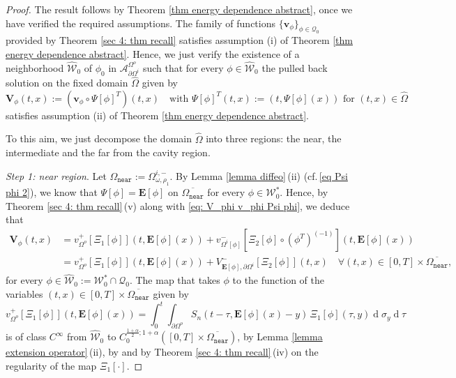 \documentclass[11pt,reqno,a4paper]{amsart}
\theoremstyle{plain}
\theoremstyle{definition}
\renewcommand{\d}[1]{\ensuremath{\operatorname{d}\!{#1}}}
\begin{document}
\begin{proof}
    The result follows by Theorem \ref{thm energy dependence abstract}, once we have verified the required assumptions. The family of functions $\{\mathbf{v}_\phi\}_{\phi \in \mathcal{Q}_0}$ provided by Theorem \ref{sec 4: thm recall} satisfies assumption (i) of Theorem \ref{thm energy dependence abstract}. Hence, we just verify the existence of a neighborhood $\widehat{\mathcal W}_0$ of $\phi_0$ in $\mathcal A_{\partial\Omega^i}^{\Omega^o}$ such that for every $\phi\in \widehat{\mathcal{W}}_0$ the pulled back solution on the fixed domain $\widehat\Omega$ given by
    \begin{equation}\label{eq: V_phi v_phi Psi phi}
    \mathbf{V}_\phi(t,x):= \left( \mathbf{v}_\phi \circ \Psi[\phi]^T \right) (t,x) 
    \quad \text{with }
    \Psi[\phi]^T(t,x):=(t,\Psi[\phi](x)) \text{ for } (t,x) \in \widehat\Omega
    \end{equation}  
    satisfies assumption (ii) of Theorem \ref{thm energy dependence abstract}.

    To this aim, we just decompose the domain $\widehat\Omega$ into three regions: the near, the intermediate and the far from the cavity region. 
    
    \smallskip
    \textit{Step 1: near region}. Let $\Omega_{\mathtt{near}}:= \Omega^{i,-}_{\omega,\rho_1}$. By Lemma \ref{lemma diffeo}\,(ii) (cf.\,\eqref{eq Psi phi 2}), we know that $\Psi[\phi] = \mathbf{E}[\phi]$ on $\overline{\Omega_{\mathtt{near}}}$ for every $\phi \in \mathcal{W}^\ast_0$. Hence, by Theorem \ref{sec 4: thm recall}\,(v) along with \eqref{eq: V_phi v_phi Psi phi}, we deduce that
    \begin{equation*}
    \begin{split}
    \mathbf{V}_\phi(t,x) &=  v^+_{\Omega^o} [\Xi_1[\phi]](t, \mathbf{E}[\phi](x)) + v^-_{\Omega^i[\phi]}
    \left[\Xi_2[\phi]\circ (\phi^T)^{(-1)}\right](t, \mathbf{E}[\phi](x))
    \\
    & = v^+_{\Omega^o} [\Xi_1[\phi]](t, \mathbf{E}[\phi](x)) + V^-_{\mathbf{E}[\phi], \partial \Omega^i}
    [\Xi_2[\phi]](t,x) \quad \forall (t,x) \in [0,T] \times \overline{\Omega_{\mathtt{near}}},
    \end{split}
    \end{equation*}
    for every $\phi \in \widehat{\mathcal{W}}_0 := \mathcal{W}^\ast_0 \cap \mathcal{Q}_0$. The map that takes $\phi$ to the function of the variables $(t,x) \in [0,T] \times \overline{\Omega_{\mathtt{near}}}$ given by
    \[
    v^+_{\Omega^o} [\Xi_1[\phi]](t, \mathbf{E}[\phi](x)) = \int_{0}^{t} \int_{\partial \Omega^o} S_n(t-\tau, \mathbf{E}[\phi](x)-y) \, \Xi_1[\phi](\tau, y) \d \sigma_y \d \tau 
    \]
    is of class $C^\infty$ from $\widehat{\mathcal{W}}_0$ to $C_0^{\frac{1+\alpha}{2}; 1+\alpha}([0,T] \times \overline{\Omega_{\mathtt{near}}})$, by Lemma \ref{lemma extension operator}\,(ii), by \cite[Lems.\,A.1,\,A.2\,\&\,A.3]{DaLu23} and by Theorem \ref{sec 4: thm recall}\,(iv) on the regularity of the map $\Xi_1[\cdot]$.


\end{proof}
\end{document}
